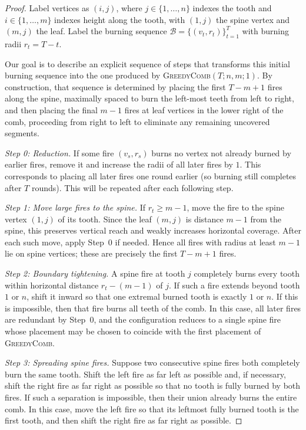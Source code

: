 \documentclass[10pt,a4paper]{amsart}
\begin{document}
\begin{proof}
Label vertices as $(i,j)$,
where $j\in\{1,\dots,n\}$ indexes the tooth
and $i\in\{1,\dots,m\}$ indexes height along the tooth,
with $(1,j)$ the spine vertex
and $(m,j)$ the leaf. Label the burning sequence $\mathcal B=\{(v_t,r_t)\}_{t=1}^T$
with burning radii $r_t=T-t$.

Our goal is to describe an explicit sequence of steps that transforms this initial burning sequence into the one produced by \textsc{GreedyComb}$(T;n,m;1)$. By construction, that sequence is determined by placing the first $T-m+1$ fires along the spine, maximally spaced to burn the left-most teeth from left to right, and then placing the final $m-1$ fires at leaf vertices in the lower right of the comb, proceeding from right to left to eliminate any remaining uncovered segments.

\medskip
\noindent
\emph{Step 0: Reduction.}
If some fire $(v_s,r_s)$ burns no vertex
not already burned by earlier fires,
remove it and increase the radii of all later fires by $1$.
This corresponds to placing all later fires one round earlier (so burning still completes after $T$ rounds). This will be repeated after each following step.

\medskip
\noindent
\emph{Step 1: Move large fires to the spine.}
If $r_t \ge m-1$,
move the fire to the spine vertex $(1,j)$ of its tooth.
Since the leaf $(m,j)$ is distance $m-1$ from the spine,
this preserves vertical reach and weakly increases horizontal coverage.
After each such move, apply Step~0 if needed.
Hence all fires with radius at least $m-1$ lie on spine vertices; these are precisely the first $T-m+1$ fires.

\medskip
\noindent
\emph{Step 2: Boundary tightening.}
A spine fire at tooth $j$ completely burns every tooth
within horizontal distance $r_t-(m-1)$ of $j$.
If such a fire extends beyond tooth $1$ or $n$,
shift it inward so that one extremal burned tooth
is exactly $1$ or $n$.
If this is impossible,
then that fire burns all teeth of the comb.
In this case, all later fires are redundant by Step~0,
and the configuration reduces to a single spine fire
whose placement may be chosen to coincide
with the first placement of \textsc{GreedyComb}.

\medskip
\noindent
\emph{Step 3: Spreading spine fires.}
Suppose two consecutive spine fires both completely burn the same tooth. 
Shift the left fire as far left as possible and, if necessary, shift the right fire as far right as possible so that no tooth is fully burned by both fires. If such a separation is impossible, then their union already burns the entire comb. In this case, move the left fire so that its leftmost fully burned tooth is the first tooth, and then shift the right fire as far right as possible. 


\end{proof}
\end{document}
